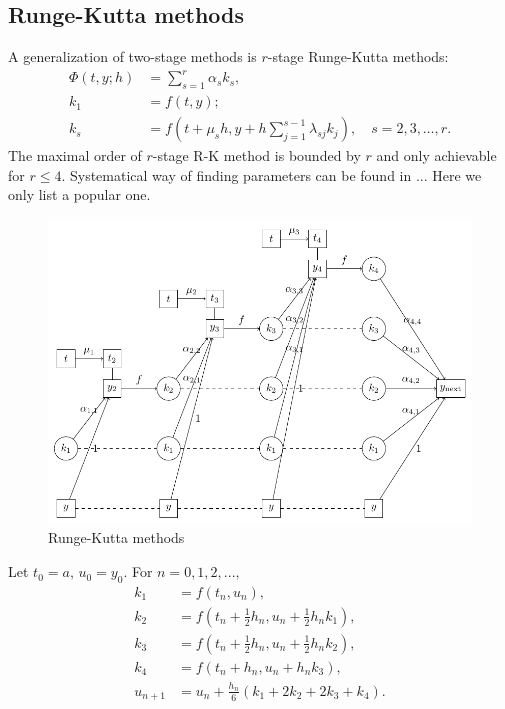 \documentclass[10pt]{amsart}
\begin{document}
\subsection{Runge-Kutta methods}
A generalization of two-stage methods is $r$-stage Runge-Kutta methods:
\begin{align*}
\Phi(t, y; h) &= \sum_{s=1}^r \alpha_s k_s,\\
k_1 &= f(t, y);\\
k_s & = f(t+\mu_s h, y + h \sum_{j=1}^{s-1}\lambda_{sj}k_j), \quad s = 2,3,\ldots, r.
\end{align*}
The maximal order of $r$-stage R-K method is bounded by $r$ and only achievable for $r\leq 4$. Systematical way of finding parameters can be found in ... Here we only list a popular one.

\begin{figure}[htbp]
\begin{center}
\includegraphics[width=4.6in]{figures/RKlatex.pdf}
\caption{Runge-Kutta methods}
\label{fig:RK}
\end{center}
\end{figure}

\begin{tcolorbox}[colframe=black!15!white, coltitle=white!5!black, title = \bf The classical $4$-th order Runge-Kutta method]
Let $t_0=a,\, u_0 = y_0$. For $n=0,1,2,...,$
\begin{align*}
k_1 &= f(t_n, u_n),\\
k_2 & = f(t_n + \frac{1}{2}h_n, u_n + \frac{1}{2}h_n k_1),\\
k_3 & = f(t_n + \frac{1}{2}h_n, u_n + \frac{1}{2}h_n k_2),\\
k_4 & = f(t_n + h_n, u_n + h_n k_3),\\
u_{n+1} &= u_n +  \frac{h_n}{6}( k_1 + 2k_2 + 2k_3 + k_4).
\end{align*}
\end{tcolorbox}
\end{document}
